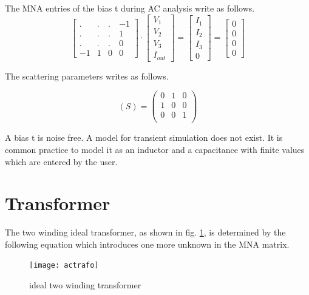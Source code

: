 The MNA entries of the bias t during AC analysis write as
follows.
\begin{equation}
\begin{bmatrix}
 . & . & .  & -1\\
 . & . & .  &  1\\
 . & . & .  &  0\\
-1 & 1 & 0  &  0
\end{bmatrix}
\cdot
\begin{bmatrix}
V_{1}\\
V_{2}\\
V_{3}\\
I_{out}
\end{bmatrix}
=
\begin{bmatrix}
I_{1}\\
I_{2}\\
I_{3}\\
0
\end{bmatrix}
=
\begin{bmatrix}
0\\
0\\
0\\
0
\end{bmatrix}
\end{equation}

The scattering parameters writes as follows.

\begin{equation}
(S) =
\begin{pmatrix}
0 & 1 & 0\\
1 & 0 & 0\\
0 & 0 & 1\\
\end{pmatrix}
\end{equation}

A bias t is noise free. A model for transient simulation does not
exist. It is common practice to model it as an inductor and a
capacitance with finite values which are entered by the user.


\section{Transformer}

The two winding ideal transformer, as shown in fig.
\ref{fig:trafo}, is determined by the following equation which
introduces one more unknown in the MNA matrix.

\begin{figure}[ht]
\begin{center}
\texttt{[image: actrafo]}
\end{center}
\caption{ideal two winding transformer}
\label{fig:trafo}
\end{figure}
\FloatBarrier

